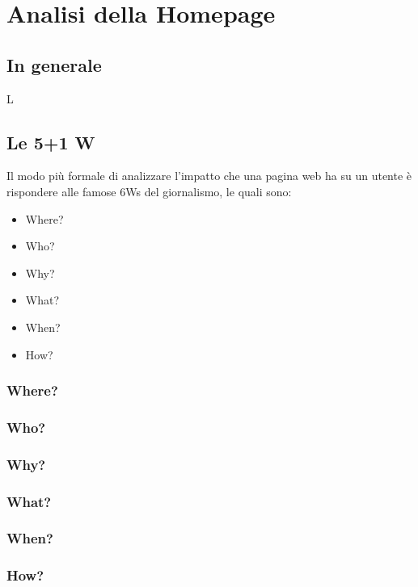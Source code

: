 \newpage
\section{Analisi della Homepage}
\subsection{In generale}
L

\subsection{Le 5+1 W}
Il modo più formale di analizzare l'impatto che una pagina web ha su un utente è rispondere alle famose 6Ws del giornalismo, le quali sono:
\begin{itemize}
\item Where?
\item Who?
\item Why?
\item What?
\item When?
\item How?
\end{itemize}

\subsubsection{Where?}


\subsubsection{Who?}


\subsubsection{Why?}


\subsubsection{What?}


\subsubsection{When?}


\subsubsection{How?}